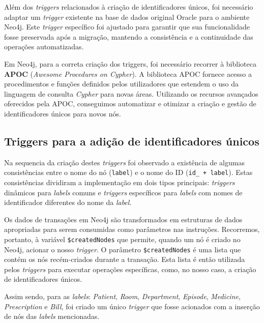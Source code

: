 Além dos \textit{triggers} relacionados à criação de identificadores únicos, foi necessário adaptar um \textit{trigger} existente na base de dados original Oracle para o ambiente Neo4j. Este \textit{trigger} específico foi ajustado para garantir que sua funcionalidade fosse preservada após a migração, mantendo a consistência e a continuidade das operações automatizadas.

Em Neo4j, para a correta criação dos triggers, foi necessário recorrer à biblioteca \textbf{APOC} (\textit{Awesome Procedures on Cypher}). A biblioteca APOC fornece acesso a procedimentos e funções definidos pelos utilizadores que estendem o uso da linguagem de consulta \textit{Cypher} para novas áreas. Utilizando os recursos avançados oferecidos pela APOC, conseguimos automatizar e otimizar a criação e gestão de identificadores únicos para novos nós.

\subsection{Triggers para a adição de identificadores únicos}

Na sequencia da criação destes \textit{triggers} foi observado a existência de algumas consistências entre o nome do nó (\texttt{label}) e o nome do ID (\texttt{id\_ + label}). Estas consistências dividiram a implementação em dois tipos principais: \textit{triggers} dinâmicos para \textit{labels} comuns e \textit{triggers} específicos para \textit{labels} com nomes de identificador diferentes do nome da \textit{label}.

Os dados de transações em Neo4j são transformados em estruturas de dados apropriadas para serem consumidas como parâmetros nas instruções. Recorremos, portanto, à variável \texttt{\$createdNodes} que permite, quando um nó é criado no Neo4j, acionar o nosso \textit{trigger}. O parâmetro \texttt{\$createdNodes} é uma lista que contém os nós recém-criados durante a transação. Esta lista é então utilizada pelos \textit{triggers} para executar operações específicas, como, no nosso caso, a criação de identificadores únicos.

Assim sendo, para as \textit{labels}: \textit{Patient}, \textit{Room}, \textit{Department}, \textit{Episode}, \textit{Medicine}, \textit{Prescription} e \textit{Bill}, foi criado um único \textit{trigger} que fosse acionados com a inserção de nós das \textit{labels} mencionadas.


